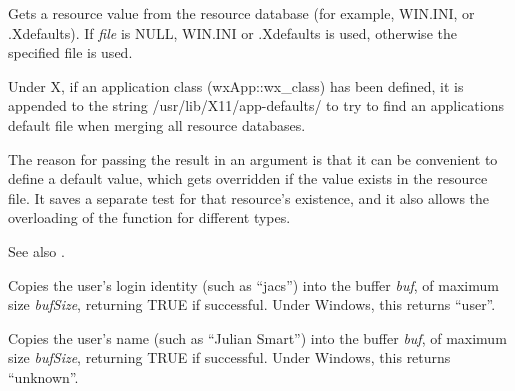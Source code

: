 \label{wxgetresource}





Gets a resource value from the resource database (for example, WIN.INI, or
.Xdefaults). If {\it file} is NULL, WIN.INI or .Xdefaults is used,
otherwise the specified file is used.

Under X, if an application class (wxApp::wx\_class) has been defined,
it is appended to the string /usr/lib/X11/app-defaults/ to try to find
an applications default file when merging all resource databases.

The reason for passing the result in an argument is that it
can be convenient to define a default value, which gets overridden
if the value exists in the resource file. It saves a separate
test for that resource's existence, and it also allows
the overloading of the function for different types.

See also .



Copies the user's login identity (such as ``jacs'') into the buffer {\it
buf}, of maximum size {\it bufSize}, returning TRUE if successful.
Under Windows, this returns ``user''.



Copies the user's name (such as ``Julian Smart'') into the buffer {\it
buf}, of maximum size {\it bufSize}, returning TRUE if successful.
Under Windows, this returns ``unknown''.

\label{wxkill}


